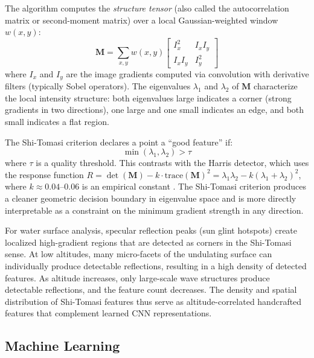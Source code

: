     The algorithm computes the \emph{structure tensor} (also called the autocorrelation matrix or second-moment matrix) over a local Gaussian-weighted window $w(x, y)$:
    \begin{equation}
        \mathbf{M} = \sum_{x, y} w(x, y)
        \begin{bmatrix}
            I_x^2 & I_x I_y \\
            I_x I_y & I_y^2
        \end{bmatrix}
        \label{eq:structure_tensor}
    \end{equation}
    where $I_x$ and $I_y$ are the image gradients computed via convolution with derivative filters (typically Sobel operators). The eigenvalues $\lambda_1$ and $\lambda_2$ of $\mathbf{M}$ characterize the local intensity structure: both eigenvalues large indicates a corner (strong gradients in two directions), one large and one small indicates an edge, and both small indicates a flat region.

    The Shi-Tomasi criterion declares a point a ``good feature'' if:
    \begin{equation}
        \min(\lambda_1, \lambda_2) > \tau
        \label{eq:shi_tomasi_criterion}
    \end{equation}
    where $\tau$ is a quality threshold. This contrasts with the Harris detector, which uses the response function $R = \det(\mathbf{M}) - k \cdot \mathrm{trace}(\mathbf{M})^2 = \lambda_1 \lambda_2 - k(\lambda_1 + \lambda_2)^2$, where $k \approx 0.04$--$0.06$ is an empirical constant \cite{Harris1988}. The Shi-Tomasi criterion produces a cleaner geometric decision boundary in eigenvalue space and is more directly interpretable as a constraint on the minimum gradient strength in any direction.

    For water surface analysis, specular reflection peaks (sun glint hotspots) create localized high-gradient regions that are detected as corners in the Shi-Tomasi sense. At low altitudes, many micro-facets of the undulating surface can individually produce detectable reflections, resulting in a high density of detected features. As altitude increases, only large-scale wave structures produce detectable reflections, and the feature count decreases. The density and spatial distribution of Shi-Tomasi features thus serve as altitude-correlated handcrafted features that complement learned CNN representations.

\subsection{Machine Learning}

